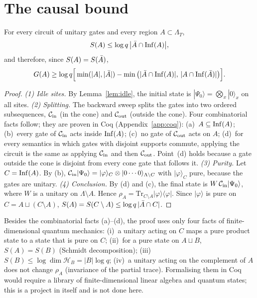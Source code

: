 \section{The causal bound}\label{sec:A}

\begin{theoremL}\label{thm:A}
For every circuit of unitary gates and every region $A\subset\Lambda_T$,
\begin{equation}\label{eq:A}
S(A)\le\log q\,\big|\bar A\cap\mathrm{Inf}(A)\big| ,
\end{equation}
and therefore, since $S(A)=S(\bar A)$,
\begin{equation}\label{eq:Agap}
G(A)\ge\log q\Big[\min(|A|,|\bar A|)-\min\big(|\bar A\cap\mathrm{Inf}(A)|,\,|A\cap\mathrm{Inf}(\bar A)|\big)\Big].
\end{equation}
\end{theoremL}

\begin{proof}
\emph{(1) Idle sites.} By Lemma~\ref{lem:idle}, the initial state is $|\Psi_0\rangle=\bigotimes_x|0\rangle_x$ on all sites.
\emph{(2) Splitting.} The backward sweep splits the gates into two ordered subsequences, $\mathcal C_{\rm in}$ (in the cone) and $\mathcal C_{\rm out}$ (outside the cone). Four combinatorial facts follow; they are proven in Coq (Appendix~\ref{app:coq}):
(a)~$A\subseteq\mathrm{Inf}(A)$;
(b)~every gate of $\mathcal C_{\rm in}$ acts inside $\mathrm{Inf}(A)$;
(c)~no gate of $\mathcal C_{\rm out}$ acts on $A$;
(d)~for every semantics in which gates with disjoint supports commute, applying the circuit is the same as applying $\mathcal C_{\rm in}$ and then $\mathcal C_{\rm out}$. Point~(d) holds because a gate outside the cone is disjoint from every cone gate that follows it.
\emph{(3) Purity.} Let $C=\mathrm{Inf}(A)$. By (b), $\mathcal C_{\rm in}|\Psi_0\rangle=|\varphi\rangle_C\otimes|0\cdots0\rangle_{\Lambda\setminus C}$ with $|\varphi\rangle_C$ pure, because the gates are unitary.
\emph{(4) Conclusion.} By (d) and (c), the final state is $W\,\mathcal C_{\rm in}|\Psi_0\rangle$, where $W$ is a unitary on $\Lambda\setminus A$. Hence $\rho_A=\mathrm{Tr}_{C\setminus A}|\varphi\rangle\langle\varphi|$. Since $|\varphi\rangle$ is pure on $C=A\sqcup(C\setminus A)$, $S(A)=S(C\setminus A)\le\log q\,|\bar A\cap C|$.
\end{proof}

\begin{remark}\label{rem:quantumfacts}
Besides the combinatorial facts (a)--(d), the proof uses only four facts of finite-dimensional quantum mechanics: (i)~a unitary acting on $C$ maps a pure product state to a state that is pure on $C$; (ii)~for a pure state on $A\sqcup B$, $S(A)=S(B)$ (Schmidt decomposition); (iii)~$S(B)\le\log\dim\mathcal H_B=|B|\log q$; (iv)~a unitary acting on the complement of $A$ does not change $\rho_A$ (invariance of the partial trace). Formalising them in Coq would require a library of finite-dimensional linear algebra and quantum states; this is a project in itself and is not done here.
\end{remark}

